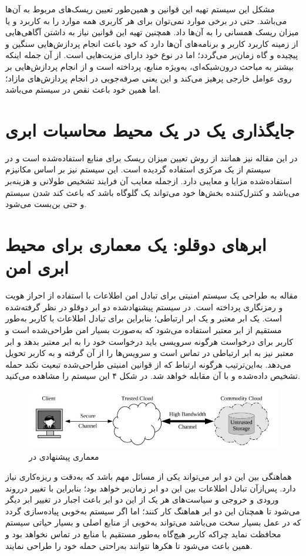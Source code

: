 \documentclass[a4paper,oneside,12pt]{report}
\begin{document}
مشکل این سیستم تهیه این قوانین و همین‌طور تعیین ریسک‌های مربوط به آن‌ها می‌باشد. حتی در برخی موارد نمی‌توان برای هر کاربری همه موارد را به کاربرد و یا میزان ریسک همسانی را به آن‌ها داد. همچنین تهیه این قوانین نیاز به داشتن آگاهی‌هایی از زمینه کاربرد کاربر و برنامه‌های آن‌ها دارد که خود باعث انجام پردازش‌هایی سنگین و پیچیده و گاه زمان‌بر می‌گردد؛ اما در نوع خود دارای مزیت‌هایی است. از آن جمله اینکه بیشتر به مباحث درون‌شبکه‌ای، به‌ویژه منابع، پرداخته است و از انجام پردازش‌هایی بر روی عوامل خارجی پرهیز می‌کند و این یعنی صرفه‌جویی در انجام پردازش‌های مازاد؛ اما همین خود باعث نقص در سیستم می‌باشد.
\section{جایگذاری یک 
در یک محيط محاسبات ابری
\cite{30}}	 
در این مقاله نیز همانند
\cite{30}
از روش تعیین میزان ریسک برای منابع استفاده‌شده است و در سیستم از یک 
مرکزی استفاده گردیده است. این سیستم نیز بر اساس مکانیزم استفاده‌شده مزایا و معایبی دارد. ازجمله معایب آن فرایند تشخیص طولانی و هزینه‌بر می‌باشد و کنترل‌کننده بخش‌ها خود می‌تواند یک گلوگاه باشد که باعث کند شدن سیستم و حتی بن‌بست می‌شود.
\section{ابرهای دوقلو: یک معماری برای محیط ابری امن}
 مقاله 
\cite{4} 
 به طراحی یک سیستم امنیتی برای تبادل امن اطلاعات با استفاده از احراز هویت و رمزنگاری پرداخته است. در سیستم پیشنهادشده دو ابر دوقلو در نظر گرفته‌شده است. یک ابر معتبر و یک ابر ارتباطی؛ بنابراین برای تبادل اطلاعات با کاربر به‌طور مستقیم از ابر معتبر استفاده می‌شود که به‌صورت بسیار امن طراحی‌شده است و کاربر برای درخواست هرگونه سرویسی باید درخواست خود را به ابر معتبر بدهد و ابر معتبر نیز به ابر ارتباطی در تماس است و سرویس‌ها را از آن گرفته و به کاربر تحویل می‌دهد. به‌این‌ترتیب هرگونه ارتباط که از قوانین امنیتی طراحی‌شده تبعیت نکند حمله تشخیص داده‌شده و با آن مقابله خواهد شد. در شکل ۴ این سیستم را مشاهده می‌کنید.
\begin{figure}
\centering
\includegraphics[scale=0.6]{fi4}
\caption{معماری پیشنهادی در 
\cite{4}}\label{fig4}
\end{figure}
هماهنگی بین این دو ابر می‌تواند یکی از مسائل مهم باشد که به‌دقت و ریزه‌کاری نیاز دارد. پس‌ازآن تبادل اطلاعات بین این دو ابر زمان‌بر خواهد بود؛ بنابراین با تغییر درروند ورودی و خروجی و سیاست‌های هر یک از این دو ابر باعث اجبار در تغییر ابر دیگر می‌شود تا همچنان این دو ابر هماهنگ کار کنند؛ اما اگر سیستم به‌خوبی پیاده‌سازی گردد که در عمل بسیار سخت می‌باشد می‌تواند به‌خوبی از منابع اصلی و بسیار حیاتی سیستم محافظت نماید چراکه کاربر هیچ‌گاه به‌طور مستقیم با منابع در تماس نخواهد بود و همین باعث می‌شود تا هکرها نتوانند به‌راحتی حمله خود را طراحی نمایند.
\end{document}
